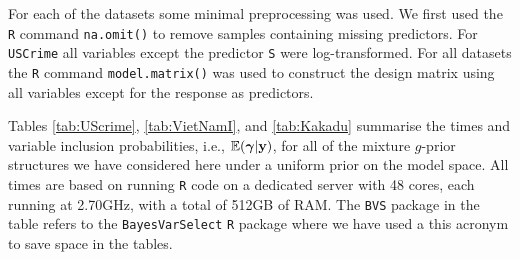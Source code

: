 {For each of the datasets some minimal preprocessing was used.  We first used
the {\tt R} command {\tt na.omit()} to remove samples containing missing
predictors.  For {\tt USCrime} all variables except the predictor {\tt S} were
log-transformed. For all datasets the {\tt R} command {\tt model.matrix()} was
used to construct the design matrix using all variables except for the response
as predictors.

Tables \ref{tab:UScrime}, \ref{tab:VietNamI}, and \ref{tab:Kakadu} summarise
the times and variable inclusion probabilities, i.e., ${\mathbb E}({\boldsymbol \gamma}|{\bf y})$, for
all of the mixture $g$-prior structures we have considered here under a uniform
prior on the model space.  All times are based on running {\tt R} code on a
dedicated server with 48 cores, each running at 2.70GHz, with a total of 512GB
of RAM.  The {\tt BVS} package in the table refers to the {\tt BayesVarSelect}
{\tt R} package where we have used a this acronym to save space in the tables. 

}
